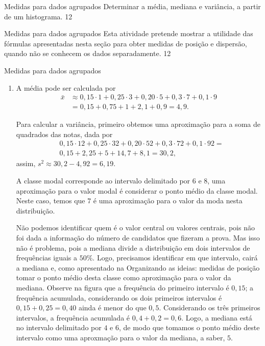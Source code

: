 \needspace{.25\textheight}
\begin{objectives}{Medidas para dados agrupados}
{
Determinar a média, mediana e variância, a partir de um histograma.
}{1}{2}
\end{objectives}
\begin{sugestions}{Medidas para dados agrupados}
{
Esta atividade pretende mostrar a utilidade das fórmulas apresentadas nesta seção para obter medidas de posição e dispersão, quando não se conhecem os dados separadamente.
}{1}{2}
\end{sugestions}
\begin{answer}{Medidas para dados agrupados}
{
\begin{enumerate}
\item A média pode ser calculada por 
\begin{align*}
\bar{x}&\approx0{,}15\cdot1+0{,}25\cdot3+0{,}20\cdot5+0{,}3\cdot7+0{,}1\cdot9\\
&=0{,}15+0{,}75+1+2{,}1+0{,}9=4{,}9.
\end{align*}

Para calcular a variância, primeiro obtemos uma aproximação para a soma de quadrados das notas, dada por
\begin{align*}
&0{,}15\cdot12+0{,}25\cdot32+0{,}20\cdot52+0{,}3\cdot72+0{,}1\cdot92=\\
&0{,}15+2{,}25+5+14{,}7+8{,}1=30{,}2, 
\end{align*}
assim, $s^2\approx30{,}2−4{,}92=6{,}19$.

A classe modal corresponde ao intervalo delimitado por $6$ e $8$, uma aproximação para o valor modal é considerar o ponto médio da classe modal. Neste caso, temos que $7$ é uma aproximação para o valor da moda nesta distribuição.

Não podemos identificar quem é o valor central ou valores centrais, pois não foi dada a informação do número de candidatos que fizeram a prova. Mas isso não é problema, pois a mediana divide a distribuição em dois intervalos de frequências iguais a $50\%$. Logo, precisamos identificar em que intervalo, cairá a mediana e, como apresentado na Organizando as ideias: medidas de posição tomar o ponto médio desta classe como aproximação para o valor da mediana. Observe na figura que a frequência do primeiro intervalo é $0{,}15$; a frequência acumulada, considerando os dois primeiros intervalos é $0{,}15+0{,}25=0{,}40$ ainda é menor do que $0{,}5$. Considerando os três primeiros intervalos, a frequência acumulada é $0{,}4+0{,}2=0{,}6$. Logo, a mediana está no intervalo delimitado por $4$ e $6$, de modo que tomamos o ponto médio deste intervalo como uma aproxmação para o valor da mediana, a saber, $5$.


\end{enumerate}}
\end{answer}

